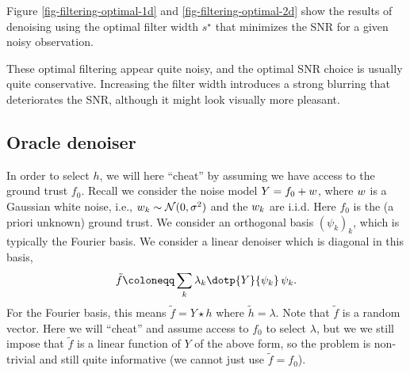 Figure \ref{fig-filtering-optimal-1d} and \ref{fig-filtering-optimal-2d} show the results of denoising using the optimal filter width $s^\star$ that minimizes the SNR for a given noisy observation. 



These optimal filtering appear quite noisy, and the optimal SNR choice is usually quite conservative. Increasing the filter width introduces a strong blurring that deteriorates the SNR, although it might look visually more pleasant.


\subsection{Oracle denoiser}

In order to select $h$, we will here ``cheat'' by assuming we have access to the ground trust $f_0$.
%
Recall we consider the noise model $Y = f_0 + w$, where $w$ is a Gaussian white noise, i.e., $w_k \sim \mathcal{N}(0, \sigma^2)$ and the $w_k$ are i.i.d. Here $f_0$ is the (a priori unknown) ground trust. We consider an orthogonal basis $(\psi_k)_k$, which is typically the Fourier basis. We consider a linear denoiser which is diagonal in this basis,
\begin{equation}\label{eq:linear-denoiser}
	\tilde{f} \coloneqq \sum_k \lambda_k \dotp{Y}{\psi_k} \, \psi_k.
\end{equation}
For the Fourier basis, this means $\tilde{f} = Y \star h$ where $\tilde{h} = \lambda$. Note that $\tilde{f}$ is a random vector.
%
Here we will ``cheat'' and assume access to $f_0$ to select $\lambda$, but we we still impose that $\tilde{f}$ is a linear function of $Y$ of the above form, so the problem is non-trivial and still quite informative (we cannot just use $\tilde f=f_0$). 

